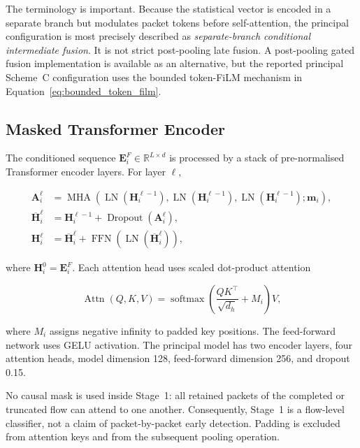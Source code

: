 \documentclass[11pt,fleqn]{report}
\begin{document}
The terminology is important. Because the statistical vector is encoded in a separate branch but modulates packet tokens before self-attention, the principal configuration is most precisely described as \emph{separate-branch conditional intermediate fusion}. It is not strict post-pooling late fusion. A post-pooling gated fusion implementation is available as an alternative, but the reported principal Scheme~C configuration uses the bounded token-FiLM mechanism in Equation~\ref{eq:bounded_token_film}.

\subsection{Masked Transformer Encoder}
\label{subsubsec:stage1_transformer}

The conditioned sequence $\mathbf{E}^{F}_i\in\mathbb{R}^{L\times d}$ is processed by a stack of pre-normalised Transformer encoder layers. For layer $\ell$,

\begin{align}
    \mathbf{A}^{\ell}_i
    &=\operatorname{MHA}
      \left(
        \operatorname{LN}(\mathbf{H}^{\ell-1}_i),
        \operatorname{LN}(\mathbf{H}^{\ell-1}_i),
        \operatorname{LN}(\mathbf{H}^{\ell-1}_i);
        \mathbf{m}_i
      \right),\\
    \overline{\mathbf{H}}^{\ell}_i
    &=\mathbf{H}^{\ell-1}_i
      +\operatorname{Dropout}(\mathbf{A}^{\ell}_i),\\
    \mathbf{H}^{\ell}_i
    &=\overline{\mathbf{H}}^{\ell}_i
      +\operatorname{FFN}
       \left(\operatorname{LN}(\overline{\mathbf{H}}^{\ell}_i)\right),
    \label{eq:stage1_transformer_layer}
\end{align}

where $\mathbf{H}^{0}_i=\mathbf{E}^{F}_i$. Each attention head uses scaled dot-product attention

\begin{equation}
    \operatorname{Attn}(Q,K,V)
    =\operatorname{softmax}
      \left(
        \frac{QK^{\top}}{\sqrt{d_h}}+M_i
      \right)V,
    \label{eq:scaled_dot_product_attention}
\end{equation}

where $M_i$ assigns negative infinity to padded key positions. The feed-forward network uses GELU activation. The principal model has two encoder layers, four attention heads, model dimension 128, feed-forward dimension 256, and dropout 0.15.

No causal mask is used inside Stage~1: all retained packets of the completed or truncated flow can attend to one another. Consequently, Stage~1 is a flow-level classifier, not a claim of packet-by-packet early detection. Padding is excluded from attention keys and from the subsequent pooling operation.
\end{document}
